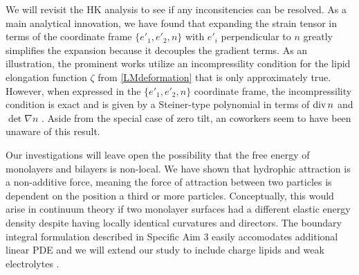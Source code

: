   We will revisit the HK analysis to see if any inconsitencies can be resolved.
  As a main analytical innovation, we have found that expanding the strain tensor in
  terms of the coordinate frame $\{e'_1, e'_2, n\}$ with $e'_i$ perpendicular to $n$
  greatly simplifies the expansion because it decouples the gradient terms. As an illustration, the prominent works
  \cite{10.1063/1.4990404, 10.1103/PhysRevE.102.042406, HaKo2000, https://doi.org/10.1039/C9SM02079A} utilize an
  incompressility condition for the lipid elongation function $\zeta$ from \eqref{LMdeformation} that is only approximately true. 
  However, when expressed in the $\{e'_1, e'_2, n\}$ coordinate frame, the incompressility condition is exact
  and is given by a Steiner-type polynomial in terms of $\operatorname{div} n$ and $\det \nabla n$ \cite{http://www.jstor.org/stable/1993504}.
  Aside from the special case of zero tilt, \cite{HaKo2000} an coworkers seem to have been unaware of this result.

Our investigations will leave open the possibility that the free energy of monolayers and bilayers is non-local. 
We have shown that hydrophic attraction is a non-additive force, meaning the force of attraction between two
particles is dependent on the position a third or more particles. Conceptually, this would arise in continuum theory if two monolayer surfaces
had a different elastic energy density despite having locally identical curvatures and directors.
The boundary integral formulation described in Specific Aim 3 easily accomodates additional linear PDE and
we will extend our study to include charge lipids and weak electrolytes \cite{DIMOVA}.

